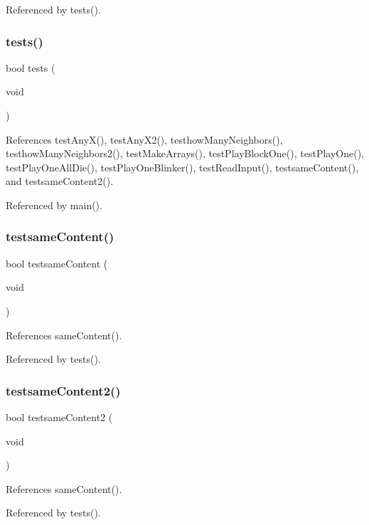 Referenced by tests().

\mbox{\label{tests_8h_a5e6e6e78df62797046c9ea173550a68a}} 
\subsubsection{tests()}
{\footnotesize\ttfamily bool tests (\begin{DoxyParamCaption}\item[{void}]{ }\end{DoxyParamCaption})}



References test\+Any\+X(), test\+Any\+X2(), testhow\+Many\+Neighbors(), testhow\+Many\+Neighbors2(), test\+Make\+Arrays(), test\+Play\+Block\+One(), test\+Play\+One(), test\+Play\+One\+All\+Die(), test\+Play\+One\+Blinker(), test\+Read\+Input(), testsame\+Content(), and testsame\+Content2().



Referenced by main().

\mbox{\label{tests_8h_ad1ec7d5978be1205c30b9afae56da573}} 
\subsubsection{testsame\+Content()}
{\footnotesize\ttfamily bool testsame\+Content (\begin{DoxyParamCaption}\item[{void}]{ }\end{DoxyParamCaption})}



References same\+Content().



Referenced by tests().

\mbox{\label{tests_8h_a8dc3ac14f36a875ee33318083f36a4f3}} 
\subsubsection{testsame\+Content2()}
{\footnotesize\ttfamily bool testsame\+Content2 (\begin{DoxyParamCaption}\item[{void}]{ }\end{DoxyParamCaption})}



References same\+Content().



Referenced by tests().

